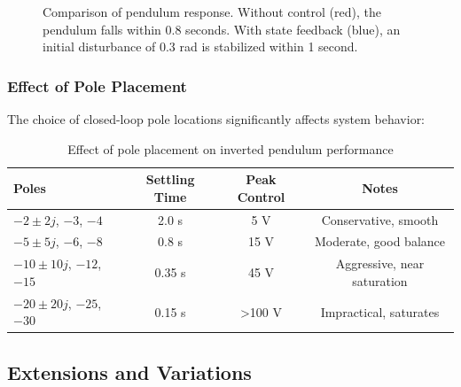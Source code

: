 \begin{figure}[htbp]
\centering
{}
\caption{Comparison of pendulum response. Without control (red), the pendulum falls within 0.8 seconds. With state feedback (blue), an initial disturbance of 0.3 rad is stabilized within 1 second.}
\label{fig:pendulum_response}
\end{figure}

\subsubsection{Effect of Pole Placement}

The choice of closed-loop pole locations significantly affects system behavior:

\begin{table}[htbp]
\centering
\caption{Effect of pole placement on inverted pendulum performance}
\label{tab:pole_effects}
\begin{tabular}{lccc}
\toprule
\textbf{Poles} & \textbf{Settling Time} & \textbf{Peak Control} & \textbf{Notes} \\
\midrule
$-2 \pm 2j$, $-3$, $-4$ & 2.0 s & 5 V & Conservative, smooth \\
$-5 \pm 5j$, $-6$, $-8$ & 0.8 s & 15 V & Moderate, good balance \\
$-10 \pm 10j$, $-12$, $-15$ & 0.35 s & 45 V & Aggressive, near saturation \\
$-20 \pm 20j$, $-25$, $-30$ & 0.15 s & >100 V & Impractical, saturates \\
\bottomrule
\end{tabular}
\end{table}

\subsection{Extensions and Variations}

